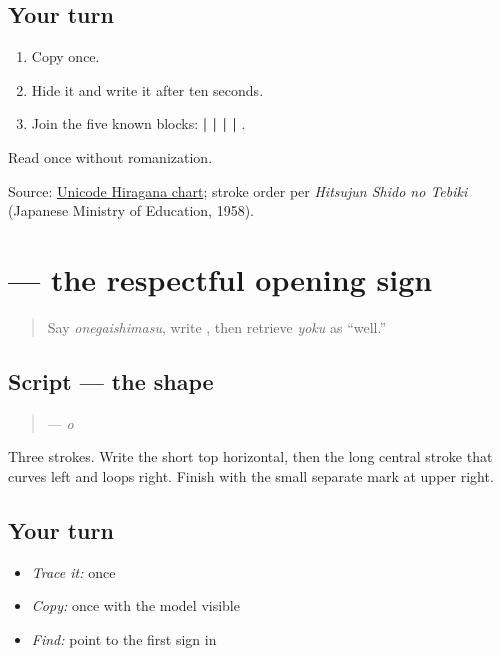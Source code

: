 \subsection*{Your turn}
\begin{enumerate}
\raggedright
  \item Copy \textbf{} once.
  \item Hide it and write it after ten seconds.
  \item Join the five known blocks: \textbf{ |  |  |  | }.
\end{enumerate}

\begin{tcolorbox}[breakable,colback=teal!4,colframe=teal!35!black,title={Before you move on}]
Read \textbf{} once without romanization.

Source: \href{https://www.unicode.org/charts/PDF/U3040.pdf}{Unicode Hiragana chart}; stroke order per \emph{Hitsujun Shido no Tebiki} (Japanese Ministry of Education, 1958).
\end{tcolorbox}
\section[\texorpdfstring{\ja{お} (o)}{お (o)}]{ — the respectful opening sign}

\label{lesson:JA-W10-o}



\begin{quote}
Say \emph{onegaishimasu}, write \textbf{}, then retrieve \emph{yoku} as “well.”
\end{quote}

\subsection*{Script — the shape}

\begin{quote}
\textbf{} — \emph{o}
\end{quote}

Three strokes. Write the short top horizontal, then the long central stroke that curves left and loops right. Finish with the small separate mark at upper right.

\subsection*{Your turn}
\begin{itemize}
\raggedright
  \item \emph{Trace it:} \textbf{} once
  \item \emph{Copy:} \textbf{} once with the model visible
  \item \emph{Find:} point to the first sign in \textbf{}
\end{itemize}

